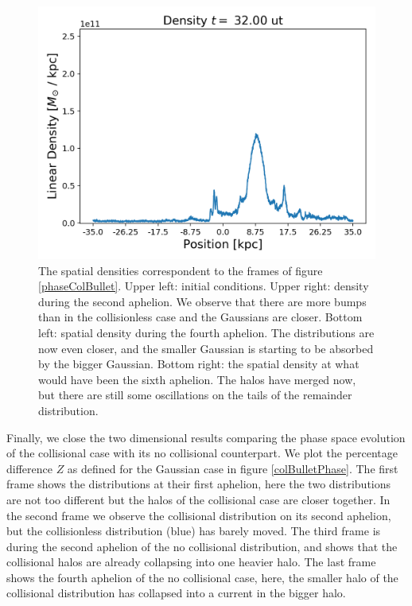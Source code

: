 {\begin{figure}[h!]
    \includegraphics[scale=0.45]{imag/cBulletD80.png}
    \caption{The spatial densities correspondent to the frames of figure \ref{phaseColBullet}. Upper left: initial conditions. Upper right: density during the second aphelion. We observe that there are more bumps than in the collisionless case and the Gaussians are closer. Bottom left: spatial density during the fourth aphelion. The distributions are now even closer, and the smaller Gaussian is starting to be absorbed by the bigger Gaussian. Bottom right: the spatial density at what would have been the sixth aphelion. The halos have merged now, but there are still some oscillations on the tails of the remainder distribution.}
    \label{densColBullet}
\end{figure}

\newpage

Finally, we close the two dimensional results comparing the phase space evolution of the collisional case with its no collisional counterpart.
We plot the percentage difference $Z$ as defined for the Gaussian case in figure \ref{colBulletPhase}.
The first frame shows the distributions at their first aphelion, here the two distributions are not too different but the halos of the collisional case are closer together.
In the second frame we observe the collisional distribution on its second aphelion, but the collisionless distribution (blue) has barely moved. The third frame is during the second aphelion of the no collisional distribution, and shows that the collisional halos are already collapsing into one heavier halo.
The last frame shows the fourth aphelion of the no collisional case, here, the smaller halo of the collisional distribution has collapsed into a current in the bigger halo.


}
